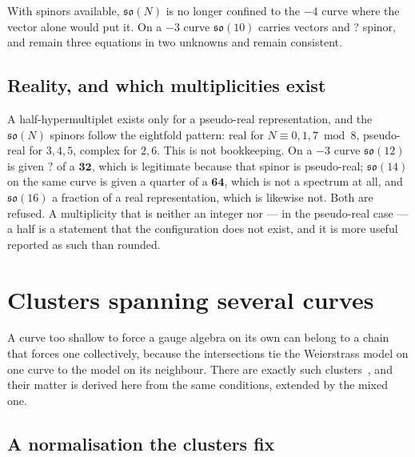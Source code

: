 \documentclass[11pt,a4paper]{article}
\newcommand{\SFSOTenMinusThreeSpin}{?}\newcommand{\SFSOTwelveHalfSpinor}{?}
\newcommand{\g}[1]{\mathfrak{#1}}
\theoremstyle{definition}
\begin{document}
With spinors available, $\g{so}(N)$ is no longer confined to the $-4$ curve
where the vector alone would put it. On a $-3$ curve $\g{so}(10)$ carries
\SFSOTenMinusThreeVec{} vectors and \SFSOTenMinusThreeSpin{} spinor, and
 remain three equations in two unknowns and
remain consistent.

\subsection{Reality, and which multiplicities exist}

A half-hypermultiplet exists only for a pseudo-real representation, and the
$\g{so}(N)$ spinors follow the eightfold pattern: real for
$N \equiv 0, 1, 7 \bmod 8$, pseudo-real for $3, 4, 5$, complex for $2, 6$.
This is not bookkeeping. On a $-3$ curve $\g{so}(12)$ is given
$\SFSOTwelveHalfSpinor$ of a $\mathbf{32}$, which is legitimate because that
spinor is pseudo-real; $\g{so}(14)$ on the same curve is given a quarter of a
$\mathbf{64}$, which is not a spectrum at all, and $\g{so}(16)$ a fraction of
a real representation, which is likewise not. Both are refused. A
multiplicity that is neither an integer nor --- in the pseudo-real case --- a
half is a statement that the configuration does not exist, and it is more
useful reported as such than rounded.


\section{Clusters spanning several curves}
\label{sec:clusters}

A curve too shallow to force a gauge algebra on its own can belong to a chain
that forces one collectively, because the intersections tie the Weierstrass
model on one curve to the model on its neighbour. There are exactly
\SFClusterCount{} such clusters~\cite{MorrisonTaylor2012}, and their matter is
derived here from the same conditions, extended by the mixed one.

\subsection{A normalisation the clusters fix}
\end{document}
